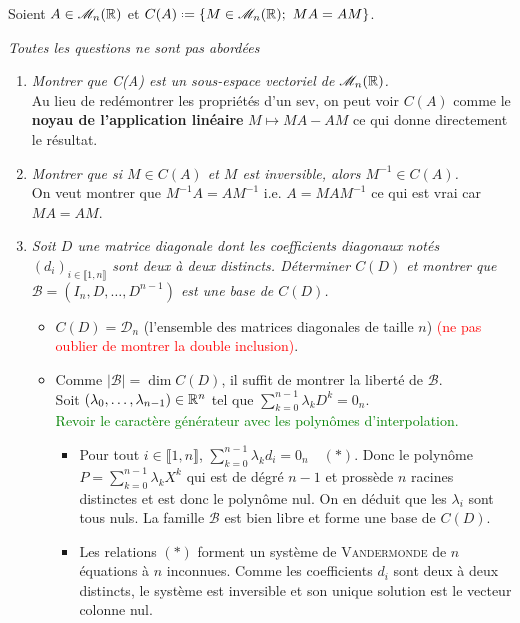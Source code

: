
\begin{defi}
    Soient $A \in \mathscr{M}_n(\mathbb{R})$ et $C(A) \defeq \{ M \in \M_n(\R);\ MA = AM \}$.
\end{defi}

\emph{Toutes les questions ne sont pas abordées}

\begin{enumerate}
    \item \emph{Montrer que C(A) est un sous-espace vectoriel de $\mathscr{M}_n(\mathbb{R})$.} \\
    Au lieu de redémontrer les propriétés d'un sev, on peut voir $C(A)$ comme le \textbf{noyau de l'application linéaire} $M \mapsto MA - AM$ ce qui donne directement le résultat. 
    \item \emph{Montrer que si $M \in C(A)$ et $M$ est inversible, alors $M^{-1} \in C(A)$.} \\
    On veut montrer que $M^{-1} A = A M^{-1}$ i.e. $A = M A M^{-1}$ ce qui est vrai car $M A = A M$.
    \item \emph{Soit $D$ une matrice diagonale dont les coefficients diagonaux notés $(d_i)_{i \in \llbracket 1, n \rrbracket}$ sont deux à deux distincts. Déterminer $C(D)$ et montrer que $\mathscr{B} = (I_n, D, \dots, D^{n-1})$ est une base de $C(D)$.}
    \begin{itemize}
        \item $C(D) = \mathscr{D}_n$ (l'ensemble des matrices diagonales de taille $n$) \textcolor{red}{(ne pas oublier de montrer la double inclusion)}.
        \item Comme $| \mathscr{B} | = \dim C(D)$, il suffit de montrer la liberté de $\mathscr{B}$. \\
        Soit $(\lambda_0, \dots, \lambda_{n-1}) \in \mathbb{R}^n$ tel que $\sum\limits_{k=0}^{n-1} \lambda_k D^k = 0_n$. \\
        \textcolor{green}{Revoir le caractère générateur avec les polynômes d'interpolation.}
        \begin{itemize}
            \item Pour tout $i \in \llbracket 1, n \rrbracket$, $\sum\limits_{k=0}^{n-1} \lambda_k d_i = 0_n \quad (*)$. Donc le polynôme $P = \sum\limits_{k=0}^{n-1} \lambda_k X^k$ qui est de dégré $n-1$ et prossède $n$ racines distinctes et est donc le polynôme nul. On en déduit que les $\lambda_i$ sont tous nuls. La famille $\mathscr{B}$ est bien libre et forme une base de $C(D)$.
            \item Les relations $(*)$ forment un système de \textsc{Vandermonde} de $n$ équations à $n$ inconnues. Comme les coefficients $d_i$ sont deux à deux distincts, le système est inversible et son unique solution est le vecteur colonne nul.

\end{itemize}
\end{itemize}
\end{enumerate}
